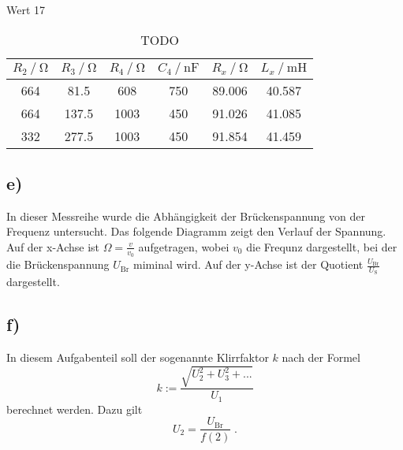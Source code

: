Wert 17

\begin{table}
  \centering
  \caption{TODO}
  \label{tab:todo4}
  \begin{tabular}{c c c c c c}
    \toprule
    $R_2 \mathbin{/} \si{\ohm}$ &
    $R_3 \mathbin{/} \si{\ohm}$ &
    $R_4 \mathbin{/} \si{\ohm}$ &
    $C_4 \mathbin{/} \si{\nano\farad}$ &
    $R_x \mathbin{/} \si{\ohm}$ &
    $L_x \mathbin{/} \si{\milli\henry}$ \\
    \midrule
    664	&  81.5	& 608  & 750 & 89.006 & 40.587  \\
    664	& 137.5	& 1003 & 450 & 91.026 & 41.085  \\
    332	& 277.5	& 1003 & 450 & 91.854 & 41.459  \\
    \bottomrule
  \end{tabular}
\end{table}

\subsection{e)}
In dieser Messreihe wurde die Abhängigkeit der Brückenspannung von der Frequenz untersucht.
Das folgende Diagramm zeigt den Verlauf der Spannung.
Auf der x-Achse ist $\Omega = \frac{v}{v_0}$ aufgetragen, wobei $v_0$ die Frequnz dargestellt, bei
der die Brückenspannung $U_\text{Br}$ miminal wird.
Auf der y-Achse ist der Quotient $\frac{U_\text{Br}}{U_\text{S}}$ dargestellt.


\subsection{f)}
In diesem Aufgabenteil soll der sogenannte Klirrfaktor $k$ nach der Formel
\begin{equation}
     k := \frac{\sqrt{U_2^2 + U_3^2 + ...}}{U_1}
\end{equation}
berechnet werden.
Dazu gilt
\begin{equation}
    U_2 = \frac{U_\text{Br}}{f(2)} \; .
\end{equation}
